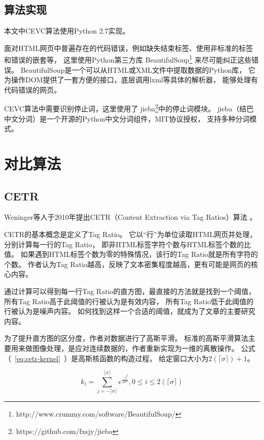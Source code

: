 \subsection{算法实现}
本文中CEVC算法使用Python 2.7实现。

面对HTML网页中普遍存在的代码错误，例如缺失结束标签、使用非标准的标签和错误的嵌套等，
这里使用Python第三方库
BeautifulSoup\footnote{http://www.crummy.com/software/BeautifulSoup/}
来尽可能纠正这些错误。
BeautifulSoup是一个可以从HTML或XML文件中提取数据的Python库，
它为操作DOM提供了一套方便的接口，底层调用lxml等具体的解析器，
能够处理有代码错误的网页。

CEVC算法中需要识别停止词，这里使用了
jieba\footnote{https://github.com/fxsjy/jieba}中的停止词模块。
jieba（结巴中文分词）是一个开源的Python中文分词组件，MIT协议授权，
支持多种分词模式。

\section{对比算法}
\label{sec:cevc-other}

\subsection{CETR}
Weninger等人于2010年提出CETR（Content Extraction via Tag Ratios）算法
。

CETR的基本概念是定义了Tag Ratio。
它以“行”为单位读取HTML网页并处理，分别计算每一行的Tag Ratio，
即非HTML标签字符个数与HTML标签个数的比值。
如果遇到HTML标签个数为零的特殊情况，该行的Tag Ratio就是所有字符的个数。
作者认为Tag Ratio越高，反映了文本密集程度越高，更有可能是网页的核心内容。

通过计算可以得到每一行Tag Ratio的直方图，最直接的方法就是找到一个阈值，
所有Tag Ratio高于此阈值的行被认为是有效内容，
所有Tag Ratio低于此阈值的行被认为是噪声内容。
如何找到这样一个合适的阈值，就成为了文章的主要研究内容。

为了提升直方图的区分度，作者对数据进行了高斯平滑。
标准的高斯平滑算法主要用来做图像处理，是应对连续数据的，作者重新实现为一维的离散操作。
公式（~\ref{eq:cetr-kernel}~）是高斯核函数的构造过程，
给定窗口大小为$2(\lceil \sigma \rceil) + 1$。

\begin{equation}
\label{eq:cetr-kernel}
k_i = \sum_{j=-\lceil \sigma \rceil}^{\lceil \sigma \rceil}
e^{\frac{-j^2}{2\sigma^2}}, 0 \leq i \leq 2(\lceil \sigma \rceil)
\end{equation}

